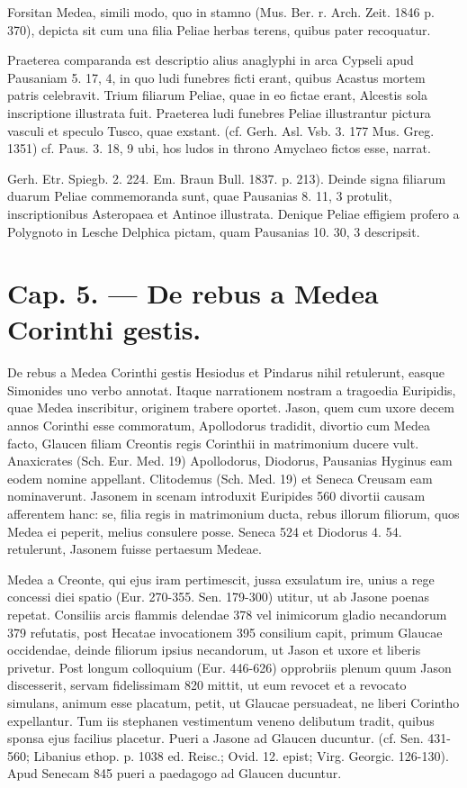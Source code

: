 \documentclass[a4paper, 11pt, oneside, polutonikogreek, german]{article}
\begin{document}
Forsitan Medea, simili modo, quo in stamno (Mus. Ber. r. Arch. Zeit. 1846 p. 370), depicta sit cum una filia Peliae herbas terens, quibus pater recoquatur.

Praeterea comparanda est descriptio alius anaglyphi in arca Cypseli apud Pausaniam 5. 17, 4, in quo ludi funebres ficti erant, quibus Acastus mortem patris celebravit. Trium filiarum Peliae, quae in eo fictae erant, Alcestis sola inscriptione illustrata fuit. Praeterea ludi funebres Peliae illustrantur pictura vasculi et speculo Tusco, quae exstant. (cf. Gerh. Asl. Vsb. 3. 177 Mus. Greg. 1351) cf. Paus. 3. 18, 9 ubi, hos ludos in throno Amyclaeo fictos esse, narrat.

Gerh. Etr. Spiegb. 2. 224. Em. Braun Bull. 1837. p. 213). Deinde signa filiarum duarum Peliae commemoranda sunt, quae Pausanias 8. 11, 3 protulit, inscriptionibus Asteropaea et Antinoe illustrata. Denique Peliae effigiem profero a Polygnoto in Lesche Delphica pictam, quam Pausanias 10. 30, 3 descripsit.
\clearpage
\section{Cap. 5. --- De rebus a Medea Corinthi gestis.}
\paragraph{}
De rebus a Medea Corinthi gestis Hesiodus et Pindarus nihil retulerunt, easque Simonides uno verbo annotat. Itaque narrationem nostram a tragoedia Euripidis, quae Medea inscribitur, originem trabere oportet. Jason, quem cum uxore decem annos Corinthi esse commoratum, Apollodorus tradidit, divortio cum Medea facto, Glaucen filiam Creontis regis Corinthii in matrimonium ducere vult. Anaxicrates (Sch. Eur. Med. 19) Apollodorus, Diodorus, Pausanias Hyginus eam eodem nomine appellant. Clitodemus (Sch. Med. 19) et Seneca Creusam eam nominaverunt. Jasonem in scenam introduxit Euripides 560 divortii causam afferentem hanc: se, filia regis in matrimonium ducta, rebus illorum filiorum, quos Medea ei peperit, melius consulere posse. Seneca 524 et Diodorus 4. 54. retulerunt, Jasonem fuisse pertaesum Medeae.

Medea a Creonte, qui ejus iram pertimescit, jussa exsulatum ire, unius a rege concessi diei spatio (Eur. 270-355. Sen. 179-300) utitur, ut ab Jasone poenas repetat. Consiliis arcis flammis delendae 378 vel inimicorum gladio necandorum 379 refutatis, post Hecatae invocationem 395 consilium capit, primum Glaucae occidendae, deinde filiorum ipsius necandorum, ut Jason et uxore et liberis privetur. Post longum colloquium (Eur. 446-626) opprobriis plenum quum Jason discesserit, servam fidelissimam 820 mittit, ut eum revocet et a revocato simulans, animum esse placatum, petit, ut Glaucae persuadeat, ne liberi Corintho expellantur. Tum iis stephanen vestimentum veneno delibutum tradit, quibus sponsa ejus facilius placetur. Pueri a Jasone ad Glaucen ducuntur. (cf. Sen. 431-560; Libanius ethop. p. 1038 ed. Reisc.; Ovid. 12. epist; Virg. Georgic. 126-130). Apud Senecam 845 pueri a paedagogo ad Glaucen ducuntur.
\end{document}
